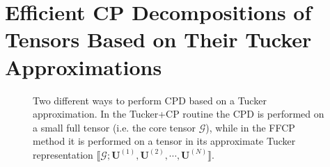 \documentclass[10pt,twocolumn,twoside]{IEEEtran}
\newcommand{\tensor}[1]{\ensuremath{\boldsymbol{\mathscr{#1}}}}
\newcommand{\compactTucker}[2]{\ensuremath{\llbracket \tensor{#1}; {\mathbf{#2}}^{(1)}, {\mathbf{#2}}^{(2)}, \cdots, {\mathbf{#2}}^{(N)}\rrbracket}}
\begin{document}
\section{Efficient CP Decompositions of Tensors Based on Their Tucker Approximations}
\label{sec:TPD}


 \begin{figure*}[!t]
\centerline{
  \;
}
\caption{Two different ways to perform CPD based on a Tucker approximation. In the Tucker+CP routine the CPD is performed on a small full tensor (i.e. the core tensor \tensor{G}), while in the FFCP method it is performed on a tensor in its approximate Tucker representation \compactTucker{G}{U}.}
\label{fig:TuckerCP}
\end{figure*}
\end{document}
